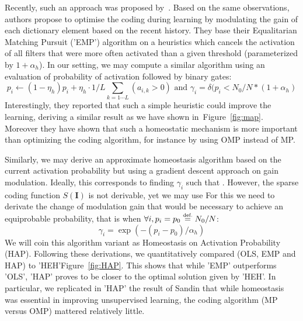 \documentclass[a4paper, 11pt, draft]{article} %
\newcommand{\image}{\mathbf{I}} %
\newcommand{\eqdef}{\ensuremath{\stackrel{\mbox{\upshape\tiny def.}}{=}}}
\newcommand{\seeFig}[1]{Figure~\ref{fig:#1}}%
\begin{document}
Recently, such an approach was proposed by~\citet{Sandin17}. Based on the same observations, authors propose to optimise the coding during learning by modulating the gain of each dictionary element based on the recent history. They base their Equalitarian Matching Pursuit ('EMP') algorithm on a heuristics which cancels the activation of all filters that were more often activated than a given threshold (parameterized by $1+\alpha_h$). In our setting, we may compute a similar algorithm using an evaluation of probability of activation followed by binary gates:
\begin{equation}%
p_i \leftarrow (1- \eta_h ) p_i + \eta_h \cdot 1/L\sum_{k=1\cdots L} (a_{i, k} > 0) \textrm{ and }
\gamma_i = \delta (p_i < N_0/N*(1+\alpha_h)
\end{equation}%
Interestingly, they reported that such a simple heuristic could improve the learning, deriving a similar result as we have shown in~\seeFig{map}. Moreover they have shown that such a homeostatic mechanism is more important than optimizing the coding algorithm, for instance by using OMP instead of MP.

Similarly, we may derive an approximate homeostasis algorithm based on the current activation probability but using a gradient descent approach on gain modulation. Ideally, this corresponds to finding $\gamma_i$ such that . However, the sparse coding function $S(\image)$ is not derivable, yet we may use 
For this we need to derivate the change of modulation gain that would be necessary to achieve an equiprobable probability, that is when $\forall i, p_i = p_0 \eqdef N_0 / N$:
\begin{equation}%
\gamma_i = \exp(-(p_i - p_0) / \alpha_h)
\end{equation}%
We will coin this algorithm variant as Homeostasis on Activation Probability (HAP). %
Following these derivations, we quantitatively compared (OLS, EMP and HAP) to 'HEH'\seeFig{HAP}. This shows that while 'EMP' outperforms 'OLS', 'HAP' proves to be closer to the optimal solution given by 'HEH'.
In particular, we replicated in 'HAP' the result of Sandin that while homeostasis was essential in improving unsupervised learning, the coding algorithm (MP versus OMP) mattered relatively little. 
\end{document}
